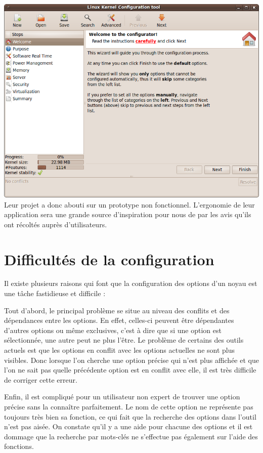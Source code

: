 \documentclass[16pts]{report}
\begin{document}
\includegraphics[scale=0.6]{illustrations/lkc-config.png} \\

Leur projet a donc abouti sur un prototype non fonctionnel.
    L’ergonomie de leur application sera une grande source d’inspiration
    pour nous de par les avis qu’ils ont récoltés auprès d’utilisateurs.

\chapter{Difficultés de la configuration}

Il existe plusieurs raisons qui font que la configuration des options d’un noyau
    est une tâche fastidieuse et difficile :

Tout d’abord, le principal problème se situe au niveau des conflits et
    des dépendances entre les options. En effet, celles-ci peuvent
    être dépendantes d’autres options ou même exclusives, c’est à dire que si
    une option est sélectionnée, une autre peut ne plus l’être.
    Le problème de certains des outils actuels est que les options en conflit
    avec les options actuelles ne sont plus visibles. Donc lorsque l’on cherche
    une option précise qui n’est plus affichée et que l’on ne sait pas quelle
    précédente option est en conflit avec elle, il est très difficile de
    corriger cette erreur.

Enfin, il est compliqué pour un utilisateur non expert de trouver une
    option précise sans la connaître parfaitement. Le nom de cette option
    ne représente pas toujours très bien sa fonction, ce qui fait que
    la recherche des options dans l’outil n’est pas aisée.
    On constate qu’il y a une aide pour chacune des options et
    il est dommage que la recherche par mots-clés ne s’effectue pas également
    sur l’aide des fonctions.
\end{document}

